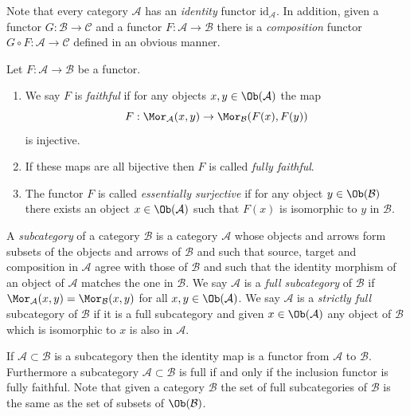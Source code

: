 \noindent
Note that every category $\mathcal{A}$ has an
{\it identity} functor $\text{id}_\mathcal{A}$.
In addition, given a functor $G : \mathcal{B} \to \mathcal{C}$
and a functor $F : \mathcal{A} \to \mathcal{B}$ there is
a {\it composition} functor $G \circ F : \mathcal{A} \to \mathcal{C}$
defined in an obvious manner.

\begin{definition}
\label{definition-faithful}
Let $F : \mathcal{A} \to \mathcal{B}$ be a functor.
\begin{enumerate}
\item We say $F$ is {\it faithful} if
for any objects $x, y \in \Ob(\mathcal{A})$ the map
$$
F : \Mor_\mathcal{A}(x, y) \to \Mor_\mathcal{B}(F(x), F(y))
$$
is injective.
\item If these maps are all bijective then $F$ is called
{\it fully faithful}.
\item
The functor $F$ is called {\it essentially surjective} if for any
object $y \in \Ob(\mathcal{B})$ there exists an object
$x \in \Ob(\mathcal{A})$ such that $F(x)$ is isomorphic to $y$ in
$\mathcal{B}$.
\end{enumerate}
\end{definition}

\begin{definition}
\label{definition-subcategory}
A {\it subcategory} of a category $\mathcal{B}$ is a category $\mathcal{A}$
whose objects and arrows form subsets of the objects and arrows of $\mathcal{B}$
and such that source, target and composition in $\mathcal{A}$ agree with those
of $\mathcal{B}$ and such that the identity morphism of an object of
$\mathcal{A}$ matches the one in $\mathcal{B}$. We say $\mathcal{A}$ is a
{\it full subcategory} of $\mathcal{B}$ if $\Mor_\mathcal{A}(x, y)
= \Mor_\mathcal{B}(x, y)$ for all $x, y \in \Ob(\mathcal{A})$.
We say $\mathcal{A}$ is a {\it strictly full} subcategory of $\mathcal{B}$
if it is a full subcategory and given $x \in \Ob(\mathcal{A})$ any
object of $\mathcal{B}$ which is isomorphic to $x$ is also in $\mathcal{A}$.
\end{definition}

\noindent
If $\mathcal{A} \subset \mathcal{B}$ is a subcategory then the
identity map is a functor from $\mathcal{A}$ to $\mathcal{B}$.
Furthermore a subcategory $\mathcal{A} \subset \mathcal{B}$
is full if and only if the inclusion functor is fully faithful.
Note that given a category $\mathcal{B}$ the set of full subcategories
of $\mathcal{B}$ is the same as the set of subsets of
$\Ob(\mathcal{B})$.

